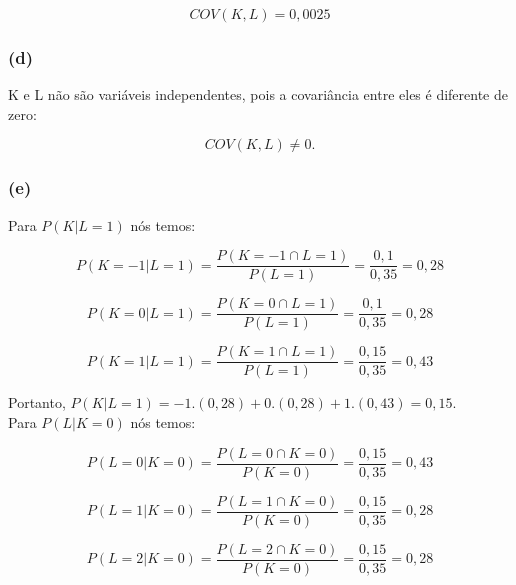 \documentclass[hidelinks,11pt]{book}
\theoremstyle{definition}
\begin{document}
\begin{displaymath}
	COV(K,L) = 0,0025
\end{displaymath}


\subsubsection{(d)}

K e L não são variáveis independentes, pois a covariância entre eles é diferente de zero:

\begin{displaymath}
	COV(K,L) \neq 0.
\end{displaymath}


\subsubsection{(e)}

Para $P(K|L = 1)$ nós temos:

\begin{displaymath}
P(K = -1|L = 1) = \frac{P(K = -1 \cap L = 1)}{P(L= 1)}= \frac{0,1}{0,35} = 0,28
\end{displaymath}

\begin{displaymath}
	P(K = 0|L = 1) = \frac{P(K = 0 \cap L = 1)}{P(L= 1)}= \frac{0,1}{0,35} = 0,28
\end{displaymath}

\begin{displaymath}
	P(K = 1|L = 1) = \frac{P(K = 1 \cap L = 1)}{P(L= 1)}= \frac{0,15}{0,35} = 0,43
\end{displaymath}

Portanto, $P(K|L = 1) = -1.(0,28) + 0.(0,28) + 1.(0,43) = 0,15$.\\

Para $P(L|K = 0)$ nós temos:

\begin{displaymath}
	P(L = 0|K = 0) = \frac{P(L = 0 \cap K = 0)}{P(K= 0)}= \frac{0,15}{0,35} = 0,43
\end{displaymath}


\begin{displaymath}
	P(L = 1|K = 0) = \frac{P(L = 1 \cap K = 0)}{P(K= 0)}= \frac{0,15}{0,35} = 0,28
\end{displaymath}

\begin{displaymath}
	P(L = 2|K = 0) = \frac{P(L = 2 \cap K = 0)}{P(K= 0)}= \frac{0,15}{0,35} = 0,28
\end{displaymath}
\end{document}
